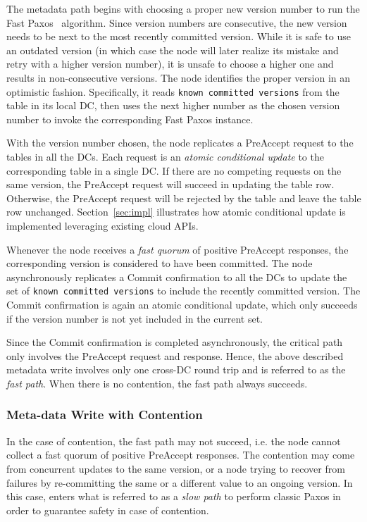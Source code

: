 The metadata path begins with choosing a proper new version number to run the
Fast Paxos~\cite{lamport05fast} algorithm. Since version numbers are
consecutive, the new version needs to be next to the most recently committed
version. While it is safe to use an outdated version (in which case the {\name}
node will later realize its mistake and retry with a higher version number), it
is unsafe to choose a higher one and results in non-consecutive versions. The
{\name} node identifies the proper version in an optimistic fashion.
Specifically, it reads {\tt known committed versions} from the table in its
local DC, then uses the next higher number as the chosen version number to
invoke the corresponding Fast Paxos instance.

With the version number chosen, the {\name} node replicates a PreAccept request
to the tables in all the DCs.
Each request is an {\em atomic conditional update} to the corresponding table in a single DC.
If there are no competing requests on the same version, the PreAccept request will succeed in updating the table row.
Otherwise, the PreAccept request will be rejected by the table and leave the table row unchanged.
Section~\ref{sec:impl} illustrates how atomic conditional update is implemented leveraging existing cloud APIs.

Whenever the {\name} node receives a {\em fast quorum} of positive PreAccept responses,
the corresponding version is considered to have been committed.
The {\name} node asynchronously replicates a Commit confirmation to all the DCs to update 
the set of {\tt known committed versions} to include the recently committed version.
The Commit confirmation is again an atomic conditional update,
which only succeeds if the version number is not yet included in the current set.

Since the Commit confirmation is completed asynchronously,
the critical path only involves the PreAccept request and response.
Hence, the above described metadata write involves only one cross-DC round trip 
and is referred to as the {\em fast path}.  When there is no
contention, the fast path always succeeds.

\subsubsection{Meta-data Write with Contention}

In the case of contention, the fast path may not succeed, i.e. the {\name} node
cannot collect a fast quorum of positive PreAccept responses. The contention
may come from concurrent updates to the same version, or a {\name} node trying
to recover from failures by re-committing the same or a different value to an
ongoing version.  In this case, {\name} enters what is referred to as a
\emph{slow path} to perform classic Paxos in order to guarantee safety in case of
contention.

